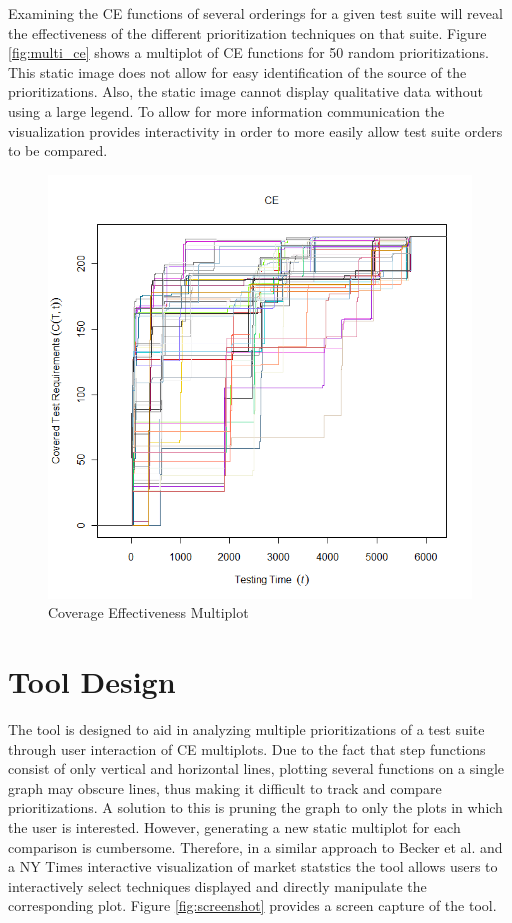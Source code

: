 \documentclass{vgtc}                          %
\begin{document}
Examining the CE functions of several orderings for a given test suite will reveal the effectiveness of the different prioritization techniques on that suite.  Figure \ref{fig:multi_ce} shows a multiplot of CE functions for 50 random prioritizations.  This static image does not allow for easy identification of the source of the prioritizations.  Also, the static image cannot display qualitative data without using a large legend.  To allow for more information communication the visualization provides interactivity in order to more easily allow test suite orders to be compared.

\begin{figure}[t]
\centering
\includegraphics[scale=.25]{original.png}
\caption{Coverage Effectiveness Multiplot}
\end{figure}
\label{fig:multi_ce}

\section{Tool Design}

The tool is designed to aid in analyzing multiple prioritizations of a test suite through user interaction of CE multiplots. Due to the fact that step functions consist of only vertical and horizontal lines, plotting several functions on a single graph may obscure lines, thus making it difficult to track and compare prioritizations.  A solution to this is pruning the graph to only the plots in which the user is interested.  However, generating a new static multiplot for each comparison is cumbersome.  Therefore, in a similar approach to Becker et al$.$ \cite{Stephen95visualizingnetwork} and a NY Times interactive visualization of market statstics \cite{nytime_multiplot} the tool allows users to interactively select techniques displayed and directly manipulate the corresponding plot.  Figure \ref{fig:screenshot} provides a screen capture of the tool.  
\end{document}
